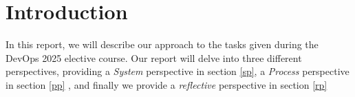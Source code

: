 \section{Introduction} %
In this report, we will describe our approach to the tasks given during the DevOps 2025 elective course. Our report will delve into three different perspectives, providing a \textit{System} perspective in section \ref{sp}, a \textit{Process} perspective in section \ref{pp} , and finally we provide a \textit{reflective} perspective in section \ref{rp}

